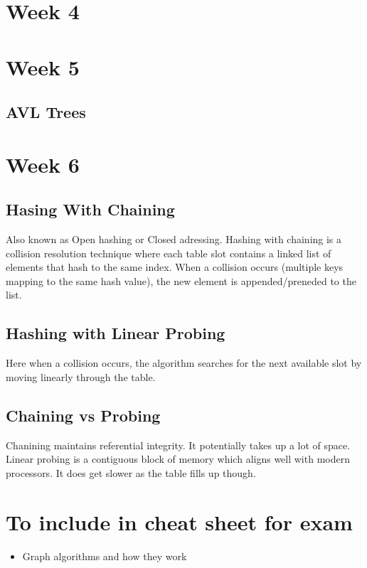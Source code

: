 \documentclass[12pt, letterpaper]{article}
\begin{document}
\section*{Week 4}

\section*{Week 5}
\subsection*{AVL Trees}

\section*{Week 6}
\subsection*{Hasing With Chaining}
Also known as Open hashing or Closed adressing.
Hashing with chaining is a collision resolution technique where 
each table slot contains a linked list of elements that hash to the 
same index. When a collision occurs (multiple keys mapping to the same 
hash value), the new element is appended/preneded to the list.

\subsection*{Hashing with Linear Probing}
Here when a collision occurs, the algorithm searches for the next 
available slot by moving linearly through the table. 

\subsection*{Chaining vs Probing}
Chanining maintains referential integrity. It potentially takes 
up a lot of space. Linear probing is a contiguous block of memory 
which aligns well with modern processors. It does get slower 
as the table fills up though.  



\section*{To include in cheat sheet for exam}
\begin{itemize}
    \item Graph algorithms and how they work 
\end{itemize}
\end{document}
